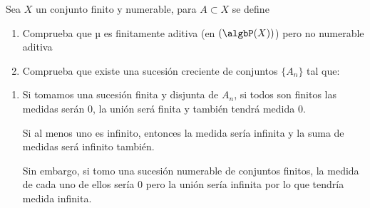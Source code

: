 \begin{problem}
Sea $X$ un conjunto finito y numerable, para $A \subset X$ se define

\begin{enumerate}
\item Comprueba que µ es finitamente aditiva (en $(\algbP (X))$) pero no numerable aditiva
\item Comprueba que existe una sucesión creciente de conjuntos $\{A_n\}$ tal que:
\end{enumerate}
\solution
\begin{enumerate}
\item Si tomamos una sucesión finita y disjunta de $A_n$, si todos son finitos las medidas serán 0, la unión será finita y también tendrá medida 0.

Si al menos uno es infinito, entonces la medida sería infinita y la suma de medidas será infinito también.

Sin embargo, si tomo una sucesión numerable de conjuntos finitos, la medida de cada uno de ellos sería 0 pero la unión sería infinita por lo que tendría medida infinita.

\end{enumerate}

\end{problem}
